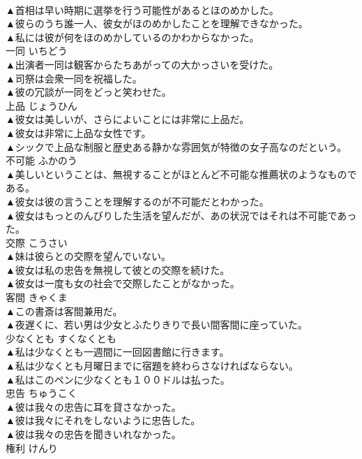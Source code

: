 \documentclass[8pt]{extreport}
\begin{document}
\begin{CJK}{UTF8}{min}
\\	▲首相は早い時期に選挙を行う可能性があるとほのめかした。 
\\	▲彼らのうち誰一人、彼女がほのめかしたことを理解できなかった。 
\\	▲私には彼が何をほのめかしているのかわからなかった。 
\\	一同	いちどう	
\\	▲出演者一同は観客からたちあがっての大かっさいを受けた。 
\\	▲司祭は会衆一同を祝福した。 
\\	▲彼の冗談が一同をどっと笑わせた。 
\\	上品	じょうひん	
\\	▲彼女は美しいが、さらによいことには非常に上品だ。 
\\	▲彼女は非常に上品な女性です。 
\\	▲シックで上品な制服と歴史ある静かな雰囲気が特徴の女子高なのだという。 
\\	不可能	ふかのう	
\\	▲美しいということは、無視することがほとんど不可能な推薦状のようなものである。 
\\	▲彼女は彼の言うことを理解するのが不可能だとわかった。 
\\	▲彼女はもっとのんびりした生活を望んだが、あの状況ではそれは不可能であった。 
\\	交際	こうさい	
\\	▲妹は彼らとの交際を望んでいない。 
\\	▲彼女は私の忠告を無視して彼との交際を続けた。 
\\	▲彼女は一度も女の社会で交際したことがなかった。 
\\	客間	きゃくま	
\\	▲この書斎は客間兼用だ。 
\\	▲夜遅くに、若い男は少女とふたりきりで長い間客間に座っていた。 
\\	少なくとも	すくなくとも	
\\	▲私は少なくとも一週間に一回図書館に行きます。 
\\	▲私は少なくとも月曜日までに宿題を終わらさなければならない。 
\\	▲私はこのペンに少なくとも１００ドルは払った。 
\\	忠告	ちゅうこく	
\\	▲彼は我々の忠告に耳を貸さなかった。 
\\	▲彼は我々にそれをしないように忠告した。 
\\	▲彼は我々の忠告を聞きいれなかった。 
\\	権利	けんり	

\end{CJK}
\end{document}
